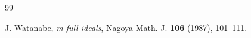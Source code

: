 \documentclass[a4paper,12pt]{amsart}
\theoremstyle{definition}
\theoremstyle{remark}
\numberwithin{equation}{section}
\begin{document}
\begin{thebibliography}{99}


{J. Watanabe}, \emph{m-full ideals}, {Nagoya Math. J.} {\bf 106} (1987), 101--111.
\end{thebibliography}
\end{document}

